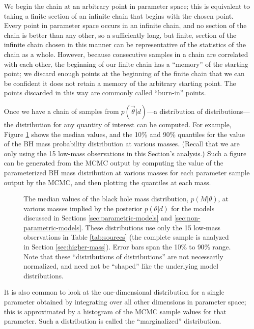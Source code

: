 \documentclass[preprint]{aastex}
\newcommand{\vtheta}{\vec{\theta}}
\begin{document}
We begin the chain at an arbitrary point in parameter space; this is
equivalent to taking a finite section of an infinite chain that begins
with the chosen point.  Every point in parameter space occurs in an
infinite chain, and no section of the chain is better than any other,
so a sufficiently long, but finite, section of the infinite chain
chosen in this manner can be representative of the statistics of the
chain as a whole.  However, because consecutive samples in a chain are
correlated with each other, the beginning of our finite chain has a
``memory'' of the starting point; we discard enough points at the
beginning of the finite chain that we can be confident it does not
retain a memory of the arbitrary starting point.  The points discarded
in this way are commonly called ``burn-in'' points.

Once we have a chain of samples from $p(\vtheta|d)$---a distribution
of distributions---the distribution for any quantity of interest can
be computed.  For example, Figure \ref{fig:dists} shows the median
values, and the 10\% and 90\% quantiles for the value of the BH mass
probability distribution at various masses.  (Recall that we are only
using the 15 low-mass observations in this Section's analysis.)  Such
a figure can be generated from the MCMC output by computing the value
of the parameterized BH mass distribution at various masses for each
parameter sample output by the MCMC, and then plotting the quantiles
at each mass.

\begin{figure}
  \begin{center}
  \end{center}
  \caption{\label{fig:dists} The median values of the black hole mass
    distribution, $p(M|\theta)$, at various masses implied by the
    posterior $p(\theta|d)$ for the models discussed in Sections
    \ref{sec:parametric-models} and
    \ref{sec:non-parametric-models}.  These distributions use only
    the 15 low-mass observations in Table \ref{tab:sources} (the
    complete sample is analyzed in Section \ref{sec:higher-mass}).
    Error bars span the 10\% to 90\% range.  Note that these
    ``distributions of distributions'' are not necessarily normalized,
    and need not be ``shaped'' like the underlying model
    distributions.}
\end{figure}

It is also common to look at the one-dimensional distribution for a
single parameter obtained by integrating over all other dimensions in
parameter space; this is approximated by a histogram of the MCMC
sample values for that parameter.  Such a distribution is called the
``marginalized'' distribution.
\end{document}
